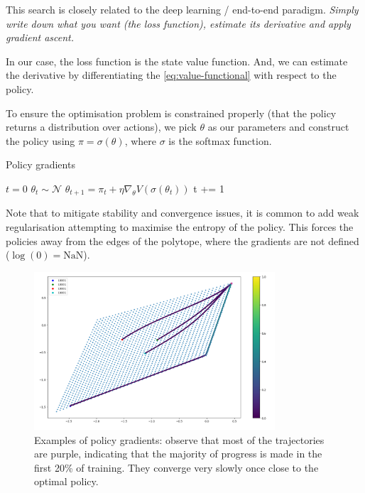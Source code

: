 This search is closely related to the deep learning / end-to-end paradigm.
\textit{Simply write down what you want (the loss function),
estimate its derivative and apply gradient ascent.}

In our case, the loss function is the state value function. And, we can estimate the derivative
by differentiating the \ref{eq:value-functional} with respect to the policy.

To ensure the optimisation problem is constrained properly (that the policy returns a distribution over actions),
we pick $\theta$ as our parameters and construct the policy using $\pi = \sigma(\theta)$, where $\sigma$ is the softmax function.

\begin{algorithm}
\caption{Policy gradients}
\begin{algorithmic}[1]

  \State $t=0$
  \State $\theta_t \sim \mathcal N$ 
    \State $\theta_{t+1} = \pi_t + \eta \nabla_{\theta} V(\sigma(\theta_t))$ 
    \State t += 1
  \EndWhile
  \State {}
\EndProcedure

\end{algorithmic}
\end{algorithm}

Note that to mitigate stability and convergence issues, it is common to add weak regularisation
attempting to maximise the entropy of the policy. This forces the policies away
from the edges of the polytope, where the gradients are not defined ($\log(0) = \text{NaN}$).

\begin{figure}[h!]
\centering
\includegraphics[width=0.8\textwidth,height=0.4\textheight]{../../pictures/figures/pg-polytope.png}
\caption{Examples of policy gradients: observe that most of the trajectories are purple,
indicating that the majority of progress is made in the first 20\% of training.
They converge very slowly once close to the optimal policy.}
\end{figure}

